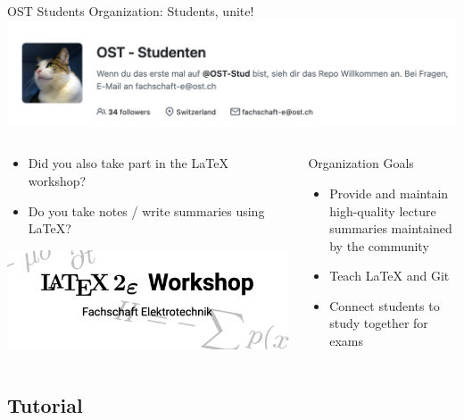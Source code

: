 \documentclass[xetex]{beamer}
\begin{document}
\begin{frame}{OST Students Organization: Students, unite!}
  \includegraphics[width=\linewidth]{pic/oststud}
  \begin{columns}[b]
    \begin{column}{.5\linewidth}
      \begin{itemize}
        \item Did you also take part in the \textrm{\LaTeX} workshop?
        \item Do you take notes / write summaries using \textrm{\LaTeX}?
      \end{itemize}
      \includegraphics[width=\linewidth]{pic/latex-ws}
    \end{column}
    \begin{column}{.5\linewidth}
      \begin{block}{Organization Goals}
        \begin{itemize}
          \item Provide and maintain high-quality lecture summaries maintained by the community
          \item Teach \textrm{\LaTeX} and Git
          \item Connect students to study together for exams
        \end{itemize}
      \end{block}
    \end{column}
  \end{columns}
\end{frame}

\subsection{Tutorial}
\end{document}
